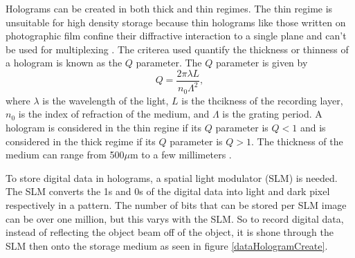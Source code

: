\documentclass[ notitlepage, numerical, 11pt]{revtex4-1} %
\begin{document}
Holograms can be created in both thick and thin regimes. The thin regime is unsuitable for high density storage because thin holograms like those written on photographic film confine their diffractive interaction to a single plane and can't be used for multiplexing \cite{HDS}. The criterea used quantify the thickness or thinness of a hologram is known as the $Q$ parameter. The $Q$ parameter is given by 
\begin{equation}
Q = \frac{2\pi\lambda L}{n_0\Lambda^2},
\label{qParameter}
\end{equation}
where $\lambda$ is the wavelength of the light, $L$ is the thcikness of the recording layer, $n_0$ is the index of refraction of the medium, and $\Lambda$ is the grating period. A hologram is considered in the thin regine if its $Q$ parameter is $Q<1$ and is considered in the thick regime if its $Q$ parameter is $Q>1$. The thickness of the medium can range from 500$\mu$m to a few millimeters \cite{HDS}.

To store digital data in holograms, a spatial light modulator (SLM) is needed. The SLM converts the 1s and 0s of the digital data into light and dark pixel respectively in a pattern. The number of bits that can be stored per SLM image can be over one million, but this varys with the SLM. So to record digital data, instead of reflecting the object beam off of the object, it is shone through the SLM then onto the storage medium as seen in figure \ref{dataHologramCreate}. 
\end{document}
